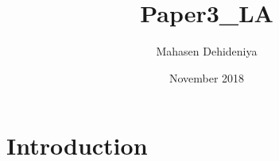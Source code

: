 \documentclass{article}
\title{Paper3_LA}
\author{Mahasen Dehideniya}
\date{November 2018}
\begin{document}
\maketitle

\section{Introduction}
\end{document}
